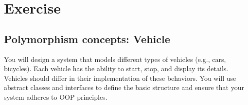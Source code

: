 \documentclass[oneside,11pt,dvipsnames]{book}
\begin{document}
\section{Exercise}



\subsection{Polymorphism concepts: Vehicle}\label{exercise:vehicle}

You will design a system that models different types of vehicles (e.g., cars, bicycles). Each vehicle has the ability to start, stop, and display its details. Vehicles should differ in their implementation of these behaviors. You will use abstract classes and interfaces to define the basic structure and ensure that your system adheres to OOP principles.
\end{document}
